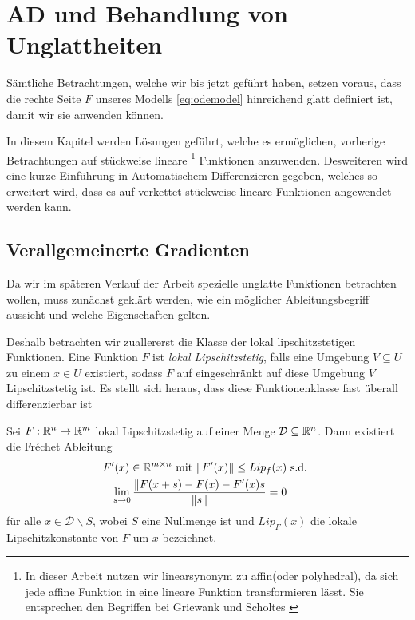 \chapter{AD und Behandlung von Unglattheiten}
 Sämtliche Betrachtungen, welche wir bis jetzt geführt haben, setzen voraus, dass die rechte Seite $F$ unseres Modells \eqref{eq:odemodel} hinreichend glatt definiert ist, damit wir sie anwenden können. 

In diesem Kapitel werden Lösungen geführt, welche es ermöglichen, vorherige Betrachtungen auf stückweise lineare
\footnote{In dieser Arbeit nutzen wir \glqq linear\grqq synonym zu \glqq affin\grqq (oder \glqq polyhedral\grqq), da sich jede affine Funktion in eine lineare Funktion  transformieren lässt. Sie entsprechen den Begriffen bei Griewank \cite{monster} und Scholtes \cite{scholtes2012introduction}}
Funktionen
anzuwenden. Desweiteren wird eine kurze Einführung in Automatischem Differenzieren gegeben, welches so erweitert wird, dass es auf verkettet stückweise lineare Funktionen angewendet werden kann.
\section{Verallgemeinerte Gradienten}
Da wir im späteren Verlauf der Arbeit spezielle unglatte Funktionen betrachten wollen, muss zunächst geklärt werden, wie ein möglicher Ableitungsbegriff aussieht und welche Eigenschaften gelten.

Deshalb betrachten wir zuallererst die Klasse der lokal lipschitzstetigen Funktionen. Eine Funktion $F$ ist \textit{lokal Lipschitzstetig}, falls eine Umgebung $V\subseteq U$ zu einem $x\in U$ existiert, sodass $F$ auf eingeschränkt auf diese Umgebung $V$ Lipschitzstetig ist.
Es stellt sich heraus, dass diese Funktionenklasse fast überall differenzierbar ist \cite[S.216 ff]{federer1969geometric}
\begin{theorem}[Rademacher]
\label{thm:rademacher}
 Sei $F:\mathbb{R}^n\to \mathbb{R}^m$ lokal Lipschitzstetig auf einer Menge $\mathcal D\subseteq \mathbb{R}^n$. Dann existiert die Fréchet Ableitung 
 \[
 \begin{aligned}
  F'(x)\in \mathbb{R}^{m\times n} \text{ mit } \|F'(x)\|  \leq Lip_f(x) & \text{ s.d. }\\
   \lim_{s\to 0}\frac{\|F(x+s)-F(x)-F'(x)s}{\|s\|} = 0&
  \end{aligned}
 \]
für alle $x\in \mathcal D\backslash S$, wobei $S$ eine Nullmenge ist und $Lip_F(x)$ die lokale Lipschitzkonstante von $F$ um $x$ bezeichnet.
\end{theorem}

